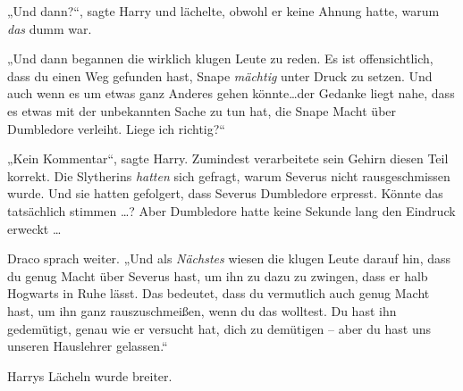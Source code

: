„Und dann?“, sagte Harry und lächelte, obwohl er keine Ahnung hatte, warum \emph{das} dumm war.

„Und dann begannen die wirklich klugen Leute zu reden. Es ist offensichtlich, dass du einen Weg gefunden hast, Snape \emph{mächtig} unter Druck zu setzen. Und auch wenn es um etwas ganz Anderes gehen könnte…der Gedanke liegt nahe, dass es etwas mit der unbekannten Sache zu tun hat, die Snape Macht über Dumbledore verleiht. Liege ich richtig?“

„Kein Kommentar“, sagte Harry. Zumindest verarbeitete sein Gehirn diesen Teil korrekt. Die Slytherins \emph{hatten} sich gefragt, warum Severus nicht rausgeschmissen wurde. Und sie hatten gefolgert, dass Severus Dumbledore erpresst. Könnte das tatsächlich stimmen …? Aber Dumbledore hatte keine Sekunde lang den Eindruck erweckt …

Draco sprach weiter. „Und als \emph{Nächstes} wiesen die klugen Leute darauf hin, dass du genug Macht über Severus hast, um ihn zu dazu zu zwingen, dass er halb Hogwarts in Ruhe lässt. Das bedeutet, dass du vermutlich auch genug Macht hast, um ihn ganz rauszuschmeißen, wenn du das wolltest. Du hast ihn gedemütigt, genau wie er versucht hat, dich zu demütigen – aber du hast uns unseren Hauslehrer gelassen.“

Harrys Lächeln wurde breiter.

